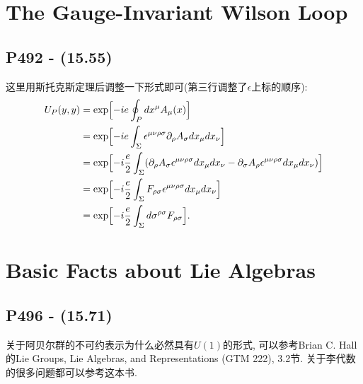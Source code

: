 \documentclass[10pt,b5paper,openany]{book}
\begin{document}
\begin{center}
\end{center}

\section{The Gauge-Invariant Wilson Loop}

\subsection{P492 - (15.55)}

这里用斯托克斯定理后调整一下形式即可(第三行调整了$\epsilon$上标的顺序): 
\begin{equation}
  \begin{aligned}
    U_P(y, y) &= \exp\Bigl[ -ie \oint_P dx^{\mu} A_{\mu}(x) \Bigr] \\
    &= \exp\Bigl[ -ie \int_{\Sigma} \epsilon^{\mu\nu\rho\sigma}\partial_{\rho} A_{\sigma} dx_{\mu}dx_{\nu}\Bigr] \\
    &= \exp\Bigl[ -i\frac{e}{2} \int_{\Sigma} (\partial_{\rho} A_{\sigma} \epsilon^{\mu\nu\rho\sigma} dx_{\mu}dx_{\nu} - \partial_{\sigma} A_{\rho} \epsilon^{\mu\nu\rho\sigma} dx_{\mu}dx_{\nu})\Bigr] \\
    &= \exp\Bigl[ -i\frac{e}{2} \int_{\Sigma} F_{\rho\sigma}\epsilon^{\mu\nu\rho\sigma} dx_{\mu}dx_{\nu}\Bigr] \\
    &= \exp\Bigl[ -i\frac{e}{2} \int_{\Sigma} d\sigma^{\rho\sigma} F_{\rho\sigma} \Bigr].
  \end{aligned}
\end{equation}

\section{Basic Facts about Lie Algebras}

\subsection{P496 - (15.71)}

关于阿贝尔群的不可约表示为什么必然具有$U(1)$的形式, 可以参考Brian C. Hall的Lie Groups, Lie Algebras, and Representations (GTM 222), 3.2节. 关于李代数的很多问题都可以参考这本书. 
\end{document}
